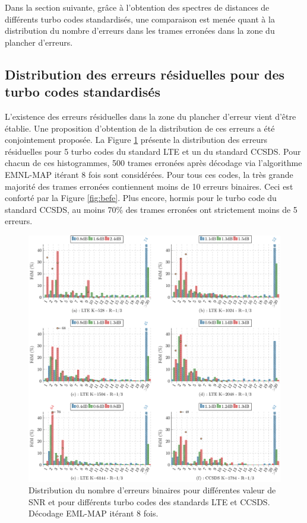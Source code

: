 Dans la section suivante, grâce à l'obtention des spectres de distances de différents turbo codes standardisés, une 
comparaison est menée quant à la distribution du nombre d'erreurs dans les trames erronées dans la zone du plancher d'erreurs.


\subsection{Distribution des erreurs résiduelles pour des turbo codes standardisés}
L'existence des erreurs résiduelles dans la zone du plancher d'erreur vient d'être établie. Une proposition d'obtention 
de la distribution de ces erreurs a été conjointement proposée. La Figure \ref{fig:be} présente la distribution des erreurs
résiduelles pour 5 turbo codes du standard LTE et un du standard CCSDS. Pour chacun de ces histogrammes, 500 trames erronées
après décodage via l'algorithme EMNL-MAP itérant 8 fois sont considérées. Pour tous ces codes, la très grande majorité des 
trames erronées contiennent moins de 10 erreurs binaires. Ceci est conforté par la Figure \ref{fig:befe}. Plus encore, 
hormis pour le turbo code du standard CCSDS, au moins 70\% des trames erronées ont strictement moins de 5 erreurs.

\begin{figure}[!ht]
	\centering
	\hspace*{-1cm}
	\includegraphics[width=1.07\textwidth]{main/ch3_fig/be/tikz/be.pdf}
	\caption{Distribution du nombre d'erreurs binaires pour différentes valeur de SNR et pour différents turbo codes des standards LTE et CCSDS. 
	Décodage EML-MAP itérant 8 fois. \label{fig:be}}
\end{figure}

